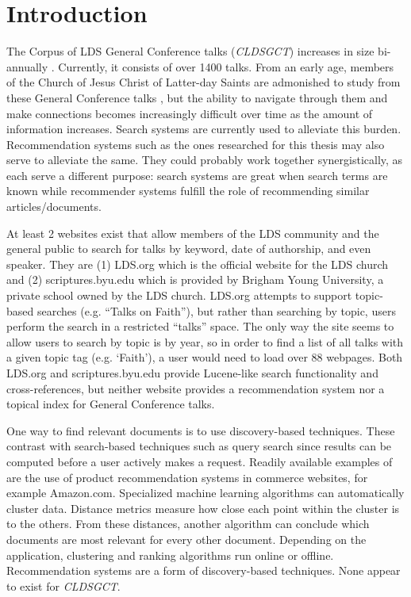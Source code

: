 \chapter{Introduction}

The Corpus of LDS General Conference talks (\emph{CLDSGCT}) increases in size bi-annually \citep{davies:gc}. Currently, it consists of over 1400 talks. From an early age, members of the Church of Jesus Christ of Latter-day Saints are admonished to study from these General Conference talks \citep{childrens_songbook}, but the ability to navigate through them and make connections becomes increasingly difficult over time as the amount of information increases. Search systems are currently used to alleviate this burden. Recommendation systems such as the ones researched for this thesis may also serve to alleviate the same. They could probably work together synergistically, as each serve a different purpose: search systems are great when search terms are known while recommender systems fulfill the role of recommending similar articles/documents.

At least 2 websites exist that allow members of the LDS community and the general public to search for talks by keyword, date of authorship, and even speaker. They are (1) LDS.org which is the official website for the LDS church and (2) scriptures.byu.edu which is provided by Brigham Young University, a private school owned by the LDS church. LDS.org attempts to support topic-based searches (e.g. ``Talks on Faith''), but rather than searching by topic, users perform the search in a restricted ``talks'' space. The only way the site seems to allow users to search by topic is by year, so in order to find a list of all talks with a given topic tag (e.g. `Faith'), a user would need to load over 88 webpages. Both LDS.org and scriptures.byu.edu provide Lucene-like search functionality \citep{McCandless:2010:LAS:1893016,lucene:luke} and cross-references, but neither website provides a recommendation system nor a topical index for General Conference talks.

One way to find relevant documents is to use discovery-based techniques. These contrast with search-based techniques such as query search since results can be computed before a user actively makes a request. Readily available examples of are the use of product recommendation systems in commerce websites, for example Amazon.com. Specialized machine learning algorithms can automatically cluster data. Distance metrics measure how close each point within the cluster is to the others. From these distances, another algorithm can conclude which documents are most relevant for every other document. Depending on the application, clustering and ranking algorithms run online or offline. Recommendation systems are a form of discovery-based techniques. None appear to exist for \emph{CLDSGCT}.

